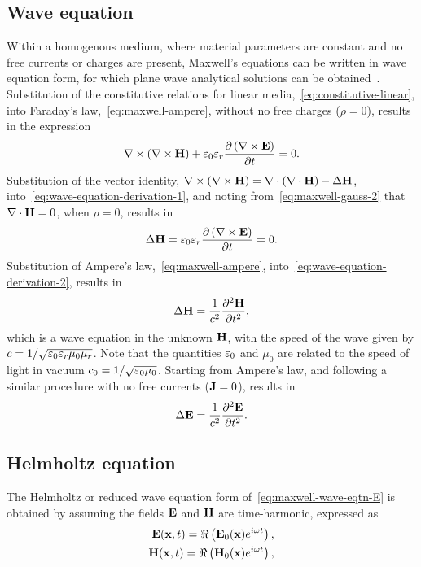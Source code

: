 \subsection{Wave equation}

Within a homogenous medium, where material parameters are constant and no free currents or charges are present, Maxwell's equations can be written in wave equation form, for which plane wave analytical solutions can be obtained~\cite{Jackson:490457}. Substitution of the constitutive relations for linear media,~\eqref{eq:constitutive-linear}, into Faraday's law,~\eqref{eq:maxwell-ampere}, without no free charges ($\rho = 0$), results in the expression
\begin{equation}
  \label{eq:wave-equation-derivation-1}
  \nabla \times ( \nabla \times \mathbf{H} ) + \varepsilon_0 \varepsilon_r \frac{\partial  \left( \nabla \times \mathbf{E}  \right) }{\partial t} = 0 .
\end{equation}
Substitution of the vector identity, $ \nabla \times ( \nabla \times \mathbf{H} ) = \nabla \cdot ( \nabla \cdot \mathbf{H} ) - \Delta \mathbf{H} $, into~\eqref{eq:wave-equation-derivation-1}, and noting from~\eqref{eq:maxwell-gauss-2} that $\nabla \cdot \mathbf{H} = 0$, when $\rho = 0$, results in
\begin{equation}
 \Delta \mathbf{H} = \varepsilon_0 \varepsilon_r \frac{\partial  \left( \nabla \times \mathbf{E}  \right) }{\partial t} = 0 . \label{eq:wave-equation-derivation-2}
\end{equation}
Substitution of Ampere's law,~\eqref{eq:maxwell-ampere}, into~\eqref{eq:wave-equation-derivation-2}, results in
\begin{equation}
  \label{eq:maxwell-wave-eqtn-H}
  \Delta \mathbf{H} = \frac{1}{c^2} \frac{\partial^2  \mathbf{H} }{\partial t^2},
\end{equation}
which is a wave equation in the unknown $\mathbf{H}$, with the speed of the wave given by $c = 1/\sqrt{\varepsilon_0 \varepsilon_r \mu_0 \mu_r }$. Note that the quantities $\varepsilon_0$ and $\mu_0$ are related to the speed of light in vacuum $c_0 = 1/\sqrt{\varepsilon_0 \mu_0 }$. Starting from Ampere's law, and following a similar procedure with no free currents ($ \mathbf{J} = 0 $), results in
\begin{equation}
  \label{eq:maxwell-wave-eqtn-E}
  \Delta \mathbf{E} = \frac{1}{c^2} \frac{\partial^2  \mathbf{E} }{\partial t^2} .
\end{equation}

\subsection{Helmholtz equation}
The Helmholtz or reduced wave equation form of~\eqref{eq:maxwell-wave-eqtn-E} is obtained by assuming the fields $\mathbf{E}$ and $\mathbf{H}$ are time-harmonic, expressed as
\begin{align}
  \label{eq:maxwell-helmholtz-time-harmonic-soltn}
  \mathbf{E}(\mathbf{x},t) = \Re \left( \mathbf{E}_0(\mathbf{x}) e^{i \omega t} \right), \\
  \mathbf{H}(\mathbf{x},t) = \Re \left( \mathbf{H}_0(\mathbf{x}) e^{i \omega t} \right),
\end{align}

